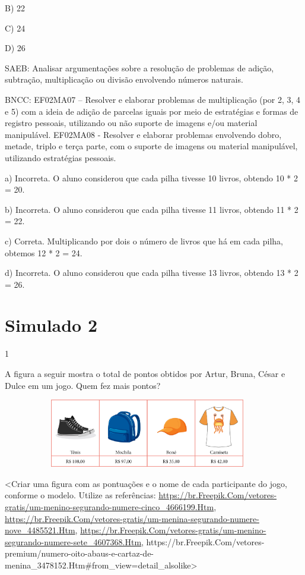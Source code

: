 \begin{escolha}
\begin{escolha}
{{{{B) 22

C) 24

D) 26

SAEB: Analisar argumentações sobre a resolução de problemas de
adição, subtração, multiplicação ou divisão envolvendo números naturais.

BNCC: EF02MA07 -- Resolver e elaborar problemas de multiplicação (por 2,
3, 4 e 5) com a ideia de adição de parcelas iguais por meio de
estratégias e formas de registro pessoais, utilizando ou não suporte de
imagens e/ou material manipulável. EF02MA08 - Resolver e elaborar
problemas envolvendo dobro, metade, triplo e terça parte, com o suporte
de imagens ou material manipulável, utilizando estratégias pessoais.

a) Incorreta. O aluno considerou que cada pilha tivesse 10 livros, obtendo 10 *
2 = 20.

b) Incorreta. O aluno considerou que cada pilha tivesse 11 livros, obtendo 11 *
2 = 22.

c) Correta. Multiplicando por dois o número de livros que há em cada
pilha, obtemos 12 * 2 = 24.

d) Incorreta. O aluno considerou que cada pilha tivesse 13 livros, obtendo 13 *
2 = 26.

\chapter{Simulado 2}

\num{1}

A figura a seguir mostra o total de pontos obtidos por Artur, Bruna, César
e Dulce em um jogo. Quem fez mais pontos?

\includegraphics[width=5.00000in,height=1.17708in]{media/image125.png}

\textless{}Criar uma figura com as pontuações e o nome de cada
participante do jogo, conforme o modelo. Utilize as referências:
\href{https://br.freepik.com/vetores-gratis/um-menino-segurando-numere-cinco_4666199.htm}{https://br.Freepik.Com/vetores-gratis/um-menino-segurando-numere-cinco\_4666199.Htm},
\href{https://br.freepik.com/vetores-gratis/um-menina-segurando-numere-nove_4485521.htm}{https://br.Freepik.Com/vetores-gratis/um-menina-segurando-numere-nove\_4485521.Htm},
\href{https://br.freepik.com/vetores-gratis/um-menino-segurando-numere-sete_4607368.htm}{https://br.Freepik.Com/vetores-gratis/um-menino-segurando-numere-sete\_4607368.Htm},
https://br.Freepik.Com/vetores-premium/numero-oito-abaus-e-cartaz-de-menina\_3478152.Htm\#from\_view=detail\_alsolike\textgreater{}

}}}}
\end{escolha}
\end{escolha}
